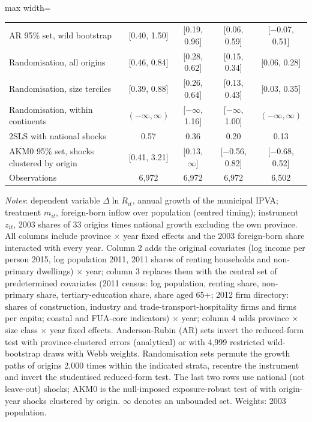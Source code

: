 \begin{table}[!htbp]
\begin{adjustbox}{max width=\linewidth}
\begin{tabular}{lcccc}
AR 95\% set, wild bootstrap & [0.40, 1.50] & [0.19, 0.96] & [0.06, 0.59] & [$-$0.07, 0.51] \\
Randomisation, all origins & [0.46, 0.84] & [0.28, 0.62] & [0.15, 0.34] & [0.06, 0.28] \\
Randomisation, size terciles & [0.39, 0.88] & [0.26, 0.64] & [0.13, 0.43] & [0.03, 0.35] \\
Randomisation, within continents & $(-\infty,\infty)$ & [$-\infty$, 1.16] & [$-\infty$, 1.00] & $(-\infty,\infty)$ \\
2SLS with national shocks & 0.57 & 0.36 & 0.20 & 0.13 \\
AKM0 95\% set, shocks clustered by origin & [0.41, 3.21] & [0.13, $\infty$] & [$-$0.56, 0.82] & [$-$0.68, 0.52] \\
Observations & 6,972 & 6,972 & 6,972 & 6,502 \\
\bottomrule
\end{tabular}\end{adjustbox}
\begin{minipage}{0.97\linewidth}\footnotesize\vspace{4pt}
\textit{Notes}: dependent variable $\Delta\ln R_{it}$, annual growth of the municipal IPVA; treatment $m_{it}$, foreign-born inflow over population (centred timing); instrument $z_{it}$, 2003 shares of 33 origins times national growth excluding the own province. All columns include province $\times$ year fixed effects and the 2003 foreign-born share interacted with every year. Column 2 adds the original covariates (log income per person 2015, log population 2011, 2011 shares of renting households and non-primary dwellings) $\times$ year; column 3 replaces them with the central set of predetermined covariates (2011 census: log population, renting share, non-primary share, tertiary-education share, share aged 65+; 2012 firm directory: shares of construction, industry and trade-transport-hospitality firms and firms per capita; coastal and FUA-core indicators) $\times$ year; column 4 adds province $\times$ size class $\times$ year fixed effects. Anderson-Rubin (AR) sets invert the reduced-form test with province-clustered errors (analytical) or with 4,999 restricted wild-bootstrap draws with Webb weights. Randomisation sets permute the growth paths of origins 2,000 times within the indicated strata, recentre the instrument and invert the studentised reduced-form test. The last two rows use national (not leave-out) shocks; AKM0 is the null-imposed exposure-robust test of \citet{adao2019} with origin-year shocks clustered by origin. $\infty$ denotes an unbounded set. Weights: 2003 population.
\end{minipage}\end{table}